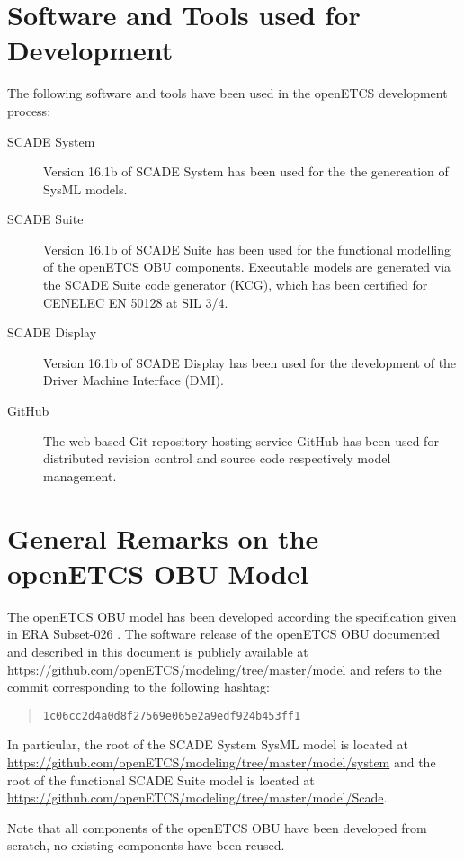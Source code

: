 \section{Software and Tools used for Development}

The following software and tools have been used in the openETCS development process:
\begin{description}
\item[SCADE System] Version 16.1b of SCADE System has been used for the the genereation of SysML models.
\item[SCADE Suite] Version 16.1b of SCADE Suite has been used for the functional modelling of the openETCS OBU components. Executable models are generated via the SCADE Suite code generator (KCG), which has been certified for CENELEC EN 50128 at SIL 3/4.
\item[SCADE Display] Version 16.1b of SCADE Display has been used for the development of the Driver Machine Interface (DMI).
\item[GitHub] The web based Git repository hosting service GitHub has been used for distributed revision control and source code respectively model management.
\end{description}


\section{General Remarks on the openETCS OBU Model}
The openETCS OBU model has been developed according the specification given in ERA Subset-026 \cite{subset-026}. The software release of the openETCS OBU documented and described in this document is publicly available at \url{https://github.com/openETCS/modeling/tree/master/model} and refers to the commit corresponding to the following hashtag:
\begin{quotation}
\centering
{}
\texttt{1c06cc2d4a0d8f27569e065e2a9edf924b453ff1}
\end{quotation}
In particular, the root of the SCADE System SysML model is located at
\url{https://github.com/openETCS/modeling/tree/master/model/system}
and the root of the functional SCADE Suite model is located at
\url{https://github.com/openETCS/modeling/tree/master/model/Scade}.

Note that all components of the openETCS OBU have been developed from scratch, no existing components have been reused.